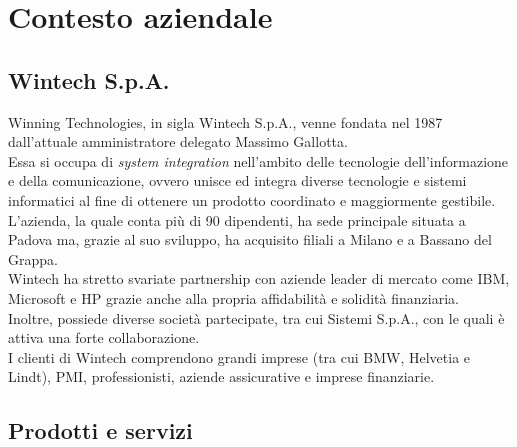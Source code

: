 \chapter{Contesto aziendale}
\label{cap:contestoAziendale}

\section{Wintech S.p.A.}
Winning Technologies, in sigla Wintech S.p.A., venne fondata nel 1987 dall'attuale amministratore delegato Massimo Gallotta.\\
Essa si occupa di \textit{system integration} nell'ambito delle tecnologie dell'informazione e della comunicazione, ovvero unisce ed integra diverse tecnologie e sistemi informatici al fine di ottenere un prodotto coordinato e maggiormente gestibile.\\
L'azienda, la quale conta più di 90 dipendenti, ha sede principale situata a Padova ma, grazie al suo sviluppo, ha acquisito filiali a Milano e a Bassano del Grappa.\\
Wintech ha stretto svariate partnership con aziende leader di mercato come IBM, Microsoft e HP grazie anche alla propria affidabilità e solidità finanziaria.\\ 
Inoltre, possiede diverse società partecipate, tra cui Sistemi S.p.A., con le quali è attiva una forte collaborazione.\\
I clienti di Wintech comprendono grandi imprese (tra cui BMW, Helvetia e Lindt), PMI, professionisti, aziende assicurative e imprese finanziarie. 

\section{Prodotti e servizi}
